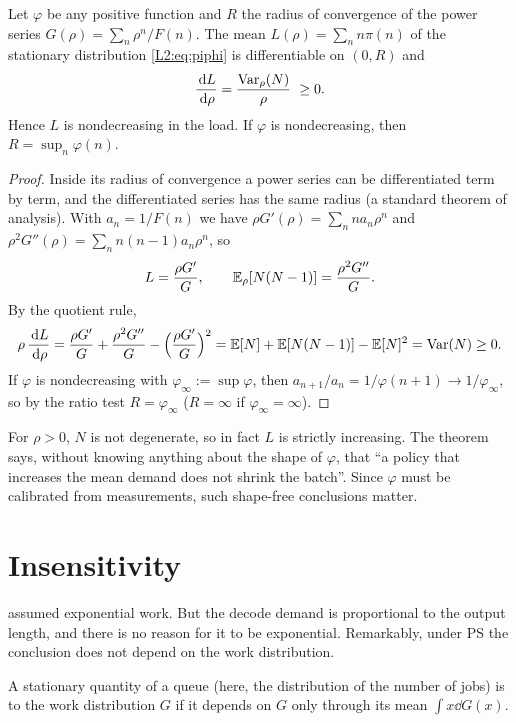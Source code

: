 \begin{theorem}\label{thm:L-mono}
Let $\varphi$ be any positive function and $R$ the radius of convergence of the power
series $G(\rho)=\sum_n\rho^n/F(n)$. The mean $L(\rho)=\sum_n n\pi(n)$ of the stationary
distribution \eqref{L2:eq:piphi} is differentiable on $(0,R)$ and
\[
  \frac{\,\mathrm{d} L}{\,\mathrm{d}\rho}=\frac{\operatorname{Var}_\rho(N)}{\rho}\ \ge 0 .
\]
Hence $L$ is nondecreasing in the load. If $\varphi$ is nondecreasing, then
$R=\sup_n\varphi(n)$.
\end{theorem}
\begin{proof}
Inside its radius of convergence a power series can be differentiated term by term,
and the differentiated series has the same radius (a standard theorem of analysis).
With $a_n=1/F(n)$ we have $\rho G'(\rho)=\sum_n n a_n\rho^n$ and
$\rho^2G''(\rho)=\sum_n n(n-1)a_n\rho^n$, so
\[
  L=\frac{\rho G'}{G},\qquad \mathbb{E}_\rho[N(N-1)]=\frac{\rho^2G''}{G}.
\]
By the quotient rule,
\[
  \rho\,\frac{\,\mathrm{d} L}{\,\mathrm{d}\rho}
  =\frac{\rho G'}{G}+\frac{\rho^2G''}{G}-\Bigl(\frac{\rho G'}{G}\Bigr)^2
  =\mathbb{E}[N]+\mathbb{E}[N(N-1)]-\mathbb{E}[N]^2=\operatorname{Var}(N)\ge0 .
\]
If $\varphi$ is nondecreasing with $\varphi_\infty:=\sup\varphi$, then
$a_{n+1}/a_n=1/\varphi(n+1)\to1/\varphi_\infty$, so by the ratio test
$R=\varphi_\infty$ ($R=\infty$ if $\varphi_\infty=\infty$).
\end{proof}

For $\rho>0$, $N$ is not degenerate, so in fact $L$ is strictly increasing. The theorem
says, without knowing anything about the shape of $\varphi$, that ``a policy that
increases the mean demand does not shrink the batch''. Since $\varphi$ must be
calibrated from measurements, such shape-free conclusions matter.

\section{Insensitivity}

 assumed exponential work. But the decode demand is proportional to the
output length, and there is no reason for it to be exponential. Remarkably, under PS
the conclusion does not depend on the work distribution.

\begin{definition}[Insensitivity]\label{L2:def:insens}
A stationary quantity of a queue (here, the distribution of the number of jobs) is
 to the work distribution $G$ if it depends on $G$ only through its
mean $\int x\dd G(x)$.
\end{definition}

